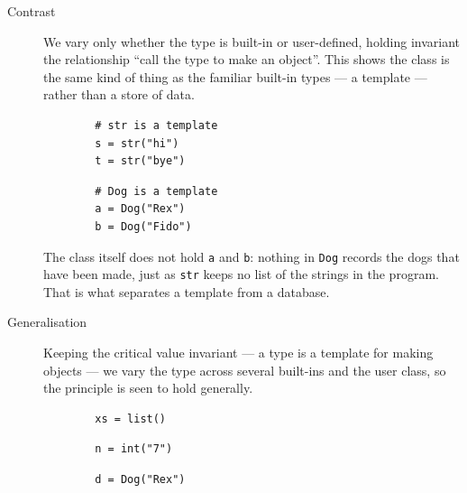 \begin{description}
  \item[Contrast] We vary only whether the type is built-in or user-defined,
    holding invariant the relationship \enquote{call the type to make an
    object}. This shows the class is the same kind of thing as the familiar
    built-in types --- a template --- rather than a store of data.

    \hfill
    \begin{minipage}[t]{0.45\columnwidth}
      \begin{verbatim}
        # str is a template
        s = str("hi")
        t = str("bye")
      \end{verbatim}
    \end{minipage}
    \hfill
    \begin{minipage}[t]{0.45\columnwidth}
      \begin{verbatim}
        # Dog is a template
        a = Dog("Rex")
        b = Dog("Fido")
      \end{verbatim}
    \end{minipage}
    \newline
    The class itself does not hold \texttt{a} and
    \texttt{b}: nothing in \texttt{Dog} records the dogs
    that have been made, just as \texttt{str} keeps no list of the
    strings in the program. That is what separates a template from a database.

  \item[Generalisation] Keeping the critical value invariant --- a type is a
    template for making objects --- we vary the type across several built-ins
    and the user class, so the principle is seen to hold generally.

    \hfill
    \begin{minipage}[t]{0.3\columnwidth}
      \begin{verbatim}
        xs = list()
      \end{verbatim}
    \end{minipage}
    \hfill
    \begin{minipage}[t]{0.3\columnwidth}
      \begin{verbatim}
        n = int("7")
      \end{verbatim}
    \end{minipage}
    \hfill
    \begin{minipage}[t]{0.3\columnwidth}
      \begin{verbatim}
        d = Dog("Rex")
      \end{verbatim}
    \end{minipage}
\end{description}

